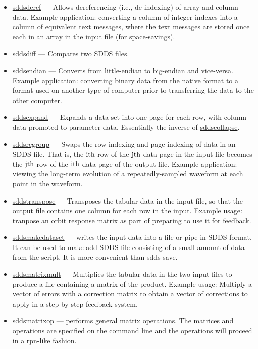 \documentclass[11pt]{article}
\newcommand{\progref}[1]{\hyperref[#1]{#1}}
\begin{document}
\begin{itemize}
\item \progref{sddsderef} --- Allows dereferencing (i.e., de-indexing) of array and column data.  Example
application: converting a column of integer indexes into a column of equivalent text messages, where the text
messages are stored once each in an array in the input file (for space-savings).
\item \progref{sddsdiff} --- Compares two SDDS files.

\item \progref{sddsendian} --- Converts from little-endian to
big-endian and vice-versa.  Example application: converting binary
data from the native format to a format used on another type of
computer prior to transferring the data to the other computer.

\item \progref{sddsexpand} --- Expands a data set into one page for each row, with column data promoted
to parameter data.  Essentially the inverse of \progref{sddscollapse}. 

\item \progref{sddsregroup} --- Swaps the row indexing and page
indexing of data in an SDDS file. That is, the ${\rm i {th}}$ row of
the ${\rm j {th}}$ data page in the input file becomes the ${\rm
j{th}}$ row of the ${\rm i {th}}$ data page of the output file.
Example application: viewing the long-term evolution of a
repeatedly-sampled waveform at each point in the waveform.

\item \progref{sddstranspose} --- Transposes the tabular data in the
input file, so that the output file contains one column for each row
in the input.  Example usage: tranpose an orbit response matrix as
part of preparing to use it for feedback.

\item \progref{sddsmakedataset} --- writes the input data into a file or 
pipe in SDDS format. It can be used to make add SDDS file consisting of
a small amount of data from the script. It is more convenient than {sdds save}.

\item \progref{sddsmatrixmult} --- Multiplies the tabular data in the
two input files to produce a file containing a matrix of the product.
Example usage: Multiply a vector of errors with a correction matrix to
obtain a vector of corrections to apply in a step-by-step feedback
system.

\item \progref{sddsmatrixop} --- performs general matrix operations. 
The matrices and operations are specified on the command line and 
the operations will proceed in a rpn-like fashion.


\end{itemize}
\end{document}
